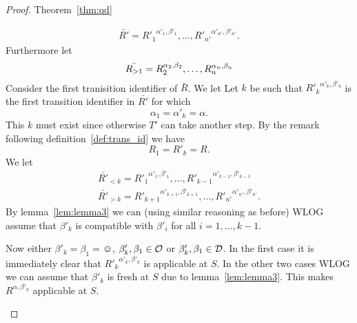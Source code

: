 \begin{proof}{Theorem~\ref{thm:qd}}
\begin{description}
\begin{equation*}
\begin{gathered}
          \bar{R'} = {R'_1}^{\alpha'_1, \beta'_1}, \dots, {R'_{n'}}^{\alpha'_{n'},
          \beta'_{n'}}.
        \end{gathered}
      \end{equation*}
      Furthermore let
      \begin{equation*}
        \bar{R_{>1}} = R_2^{\alpha_2, \beta_2}, \dots, R_n^{\alpha_n, \beta_n} \\
      \end{equation*}
      Consider the first tranisition identifier of $\bar{R}$. We let
      Let $k$ be such
      that ${R'_k}^{\alpha'_k, \beta'_k}$ is the first transition identifier in
      $\bar{R'}$ for which 
      \begin{equation*}
        \alpha_1 = \alpha'_k = \alpha.
      \end{equation*} 
      This $k$ must exist since
      otherwise $T'$ can take another step. By the remark following
      definition~\ref{def:trans_id} we have 
      \begin{equation*}
        R_1 = R'_k = R.
      \end{equation*} 
      We let
      \begin{equation*}
        \begin{gathered}
          \bar{R'}_{<k} = {R'_1}^{\alpha'_1, \beta'_1}, \dots,
          {R'_{k-1}}^{\alpha'_{k-1}, \beta'_{k-1}}  \\
          \bar{R'}_{>k} = {R'_{k+1}}^{\alpha'_{k+1}, \beta'_{k+1}}, \dots,
          {R'_{n'}}^{\alpha'_{n'}, \beta'_{n'}}.
        \end{gathered}
      \end{equation*}
      By lemma~\ref{lem:lemma3} we can (using similar reasoning as before) WLOG
      assume that $\beta'_k$ is compatible with $\beta'_i$ for all $i = 1,
      \dots, k-1$.

      Now either $\beta'_k = \beta_1 = \smiley$, $\beta'_k, \beta_1 \in \mathcal{O}$
      or $\beta'_k, \beta_1 \in \mathcal{D}$. In the first case it is immediately
      clear that ${R'_k}^{\alpha'_k, \beta'_k}$ is applicable at $S$. In the
      other two cases WLOG we can assume that $\beta'_k$ is fresh at $S$ due to
      lemma~\ref{lem:lemma3}. This makes $R^{\alpha, \beta'_k}$
      applicable at $S$.


\end{description}
\end{proof}
